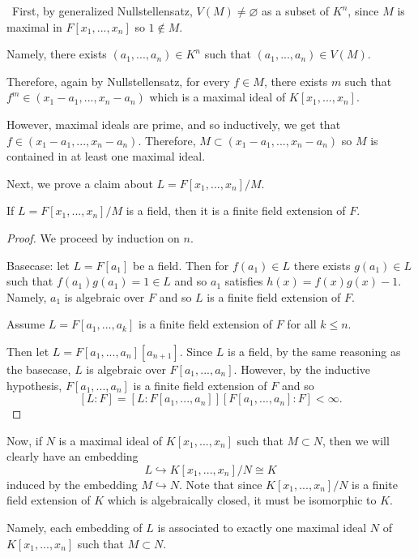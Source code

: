 \documentclass[12pt]{Qual}
\begin{document}
\begin{solution}$\,$
First, by generalized Nullstellensatz, $V(M)\not=\varnothing$ as a subset of $K^n$, since $M$ is maximal in $F[x_1,...,x_n]$ so $1\notin M.$

Namely, there exists $(a_1,...,a_n)\in K^n$ such that $(a_1,...,a_n)\in V(M).$

Therefore, again by Nullstellensatz, for every $f\in M$, there exists $m$ such that $f^m\in(x_1-a_1,...,x_n-a_n)$ which is a maximal ideal of $K[x_1,...,x_n].$

However, maximal ideals are prime, and so inductively, we get that $f\in(x_1-a_1,...,x_n-a_n)$. Therefore, $M\subset (x_1-a_1,...,x_n-a_n)$ so $M$ is contained in at least one maximal ideal.


Next, we prove a claim about $L=F[x_1,...,x_n]/M$.

\begin{claim} If $L=F[x_1,...,x_n]/M$ is a field, then it is a finite field extension of $F$.
\begin{proof} We proceed by induction on $n.$

Basecase: let $L=F[a_1]$ be a field. Then for $f(a_1)\in L$ there exists $g(a_1)\in L$ such that $f(a_1)g(a_1)=1\in L$ and so $a_1$ satisfies $h(x)=f(x)g(x)-1$. Namely, $a_1$ is algebraic over $F$ and so $L$ is a finite field extension of $F.$

Assume $L=F[a_1,...,a_k]$ is a finite field extension of $F$ for all $k\le n$.

Then let $L=F[a_1,...,a_n][a_{n+1}]$. Since $L$ is a field, by the same reasoning as the basecase, $L$ is algebraic over $F[a_1,...,a_n]$. However, by the inductive hypothesis, $F[a_1,...,a_n]$ is a finite field extension of $F$ and so $$[L:F]=[L:F[a_1,...,a_n]][F[a_1,...,a_n]:F]<\infty.$$
\end{proof}
\end{claim}

Now, if $N$ is a maximal ideal of $K[x_1,...,x_n]$ such that $M\subset N$, then we will clearly have an embedding $$L\hookrightarrow K[x_1,...,x_n]/N\cong K$$ induced by the embedding $M\hookrightarrow N$. Note that since $K[x_1,...,x_n]/N$ is a finite field extension of $K$ which is algebraically closed, it must be isomorphic to $K.$

Namely, each embedding of $L$ is associated to exactly one maximal ideal $N$ of $K[x_1,...,x_n]$ such that $M\subset N$.


\end{solution}
\end{document}
